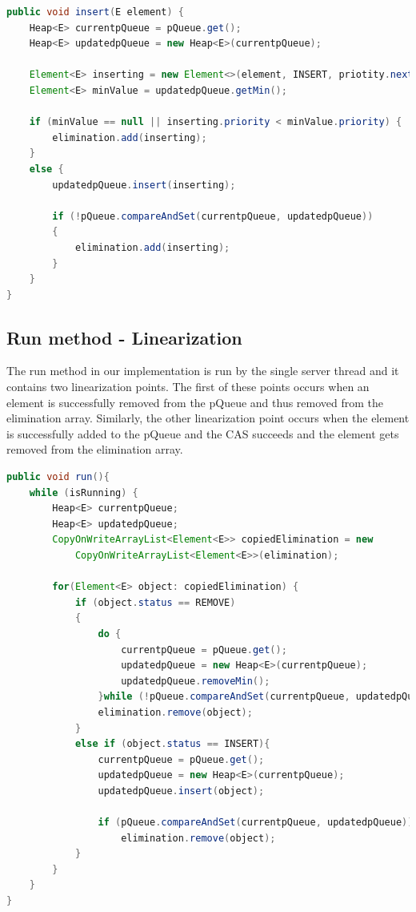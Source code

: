 \documentclass[10pt]{asme2ej}
\begin{document}
\begin{lstlisting}[language=Java]
public void insert(E element) {
    Heap<E> currentpQueue = pQueue.get();
    Heap<E> updatedpQueue = new Heap<E>(currentpQueue);

    Element<E> inserting = new Element<>(element, INSERT, priotity.nextInt());
    Element<E> minValue = updatedpQueue.getMin();

    if (minValue == null || inserting.priority < minValue.priority) {
        elimination.add(inserting);
    }
    else {
        updatedpQueue.insert(inserting);

        if (!pQueue.compareAndSet(currentpQueue, updatedpQueue))
        {
            elimination.add(inserting);
        }
    }
}
\end{lstlisting}

\subsection{Run method - Linearization}
The run method in our implementation is run by the single server thread and it contains two linearization points. The first of these points occurs when an element is successfully removed from the pQueue and thus removed from the elimination array. Similarly, the other linearization point occurs when the element is successfully added to the pQueue and the CAS succeeds and the element gets removed from the elimination array. 

\begin{lstlisting}[language=Java]
 public void run(){
    while (isRunning) {
        Heap<E> currentpQueue;
        Heap<E> updatedpQueue;
        CopyOnWriteArrayList<Element<E>> copiedElimination = new 
            CopyOnWriteArrayList<Element<E>>(elimination);
            
        for(Element<E> object: copiedElimination) {
            if (object.status == REMOVE)
            {
                do {
                    currentpQueue = pQueue.get();
                    updatedpQueue = new Heap<E>(currentpQueue);
                    updatedpQueue.removeMin();
                }while (!pQueue.compareAndSet(currentpQueue, updatedpQueue));
                elimination.remove(object);
            }
            else if (object.status == INSERT){
                currentpQueue = pQueue.get();
                updatedpQueue = new Heap<E>(currentpQueue);
                updatedpQueue.insert(object);

                if (pQueue.compareAndSet(currentpQueue, updatedpQueue))
                    elimination.remove(object);
            }
        }
    }
}
\end{lstlisting}
\end{document}
